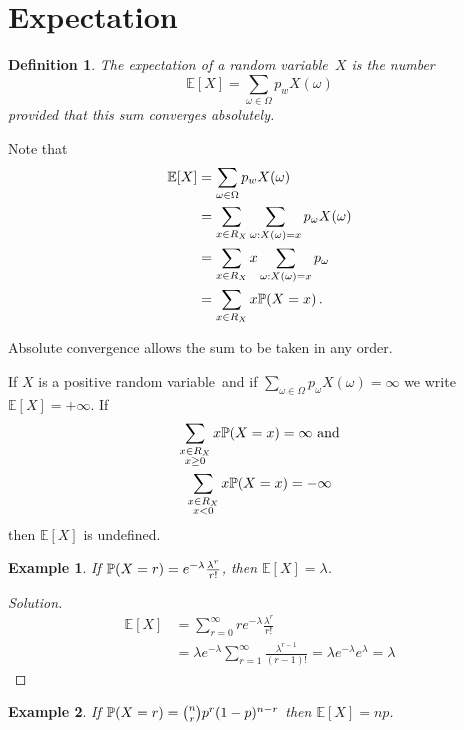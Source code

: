\documentclass{notes}
\theoremstyle{plain}
\newtheorem*{example}{Example}
\newtheorem{definition}{Definition}[chapter]
\newcommand{\bP}{\mathbb{P}}
\newcommand{\bE}{\mathbb{E}}
\newcommand{\prob}[1]{\bP \negthinspace\left(#1\right)}
\newcommand{\rv}{random variable\ }
\newcommand{\expect}[1]{\bE\!\left[#1\right]}
\begin{document}
\section{Expectation}
\begin{definition}
The expectation of a \rv $X$ is the number
\[
\expect{X} = \sum_{\omega \in \Omega} p_w X(\omega)
\]
provided that this sum converges absolutely.
\end{definition}

Note that
\begin{align*}
\expect{X} &= \sum_{\omega \in \Omega} p_w X(\omega) \\
&= \sum_{x \in R_X} \sum_{\omega : X(\omega) = x} p_\omega X(\omega) \\
&= \sum_{x \in R_X} x \sum_{\omega : X(\omega) = x} p_\omega \\
&= \sum_{x \in R_X} x \prob{X = x}.
\end{align*}

Absolute convergence allows the sum to be taken in any order.

If $X$ is a positive \rv and if $\sum_{\omega \in \Omega} p_\omega X(\omega)
= \infty$ we write $\expect{X} = + \infty$.  If 
\begin{gather*}
\sum_{\substack{x \in R_X \\ x \ge 0}} x \prob{X = x} = \infty \text{ and} \\
\sum_{\substack{x \in R_X \\ x < 0}} x \prob{X = x} = - \infty
\end{gather*}
then $\expect{X}$ is undefined.

\begin{example}
If $\prob{X = r} = e^{-\lambda} \tfrac{\lambda^r}{r!}$, then
$\expect{X} = \lambda$.
\end{example}

\begin{proof}[Solution]
\begin{align*}
\expect{X} &= \sum_{r = 0}^\infty r e^{-\lambda} \tfrac{\lambda^r}{r!} \\
& = \lambda e^{-\lambda} \sum_{r=1}^\infty \frac{\lambda^{r-1}}{(r-1)!} = \lambda e^{-\lambda}
e^{\lambda} = \lambda
\end{align*}
\end{proof}

\begin{example}
If $\prob{X=r} = \binom{n}{r} p^r (1-p)^{n-r}$ then $\expect{X}=n p$.
\end{example}
\end{document}
